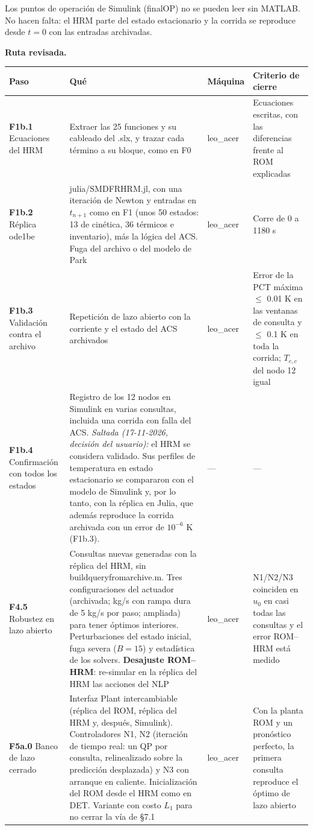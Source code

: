 \documentclass[11pt,a4paper]{article}
\newcommand{\codeus}{\textunderscore\allowbreak}
\newcommand{\code}[1]{{\small\ttfamily\let\_\codeus #1}}
\begin{document}
Los puntos de operación de Simulink (\code{finalOP\_*}) no se pueden leer sin MATLAB. No hacen falta: el HRM parte del estado estacionario y la corrida se reproduce desde $t=0$ con las entradas archivadas.

\textbf{Ruta revisada.}

{\footnotesize
\begin{xltabular}{\linewidth}{@{}YYYY@{}}
\toprule
\textbf{Paso} & \textbf{Qué} & \textbf{Máquina} & \textbf{Criterio de cierre} \\
\midrule
\endhead
\textbf{F1b.1} Ecuaciones del HRM & Extraer las 25 funciones y su cableado del \code{.slx}, y trazar cada término a su bloque, como en F0 & leo\_acer & Ecuaciones escritas, con las diferencias frente al ROM explicadas \\
\textbf{F1b.2} Réplica \code{ode1be} & \code{julia/SMDFRHRM.jl}, con una iteración de Newton y entradas en $t_{n+1}$ como en F1 (unos 50 estados: 13 de cinética, 36 térmicos e inventario), más la lógica del ACS. Fuga del archivo o del modelo de Park & leo\_acer & Corre de 0 a 1180 s \\
\textbf{F1b.3} Validación contra el archivo & Repetición de lazo abierto con la corriente y el estado del ACS archivados & leo\_acer & Error de la PCT máxima $\le$ 0.01 K en las ventanas de consulta y $\le$ 0.1 K en toda la corrida; $T_{e,c}$ del nodo 12 igual \\
\textbf{F1b.4} Confirmación con todos los estados & Registro de los 12 nodos en Simulink en varias consultas, incluida una corrida con falla del ACS. \emph{Saltada (17-11-2026, decisión del usuario):} el HRM se considera validado. Sus perfiles de temperatura en estado estacionario se compararon con el modelo de Simulink y, por lo tanto, con la réplica en Julia, que además reproduce la corrida archivada con un error de $10^{-6}$ K (F1b.3). & — & — \\
\textbf{F4.5} Robustez en lazo abierto & Consultas nuevas generadas con la réplica del HRM, sin \code{build\_query\_from\_archive.m}. Tres configuraciones del actuador (archivada; kg/s con rampa dura de 5 kg/s por paso; ampliada) para tener óptimos interiores. Perturbaciones del estado inicial, fuga severa ($B=15$) y estadística de los solvers. \textbf{Desajuste ROM–HRM}: re-simular en la réplica del HRM las acciones del NLP & leo\_acer & N1/N2/N3 coinciden en $u_0$ en casi todas las consultas y el error ROM–HRM está medido \\
\textbf{F5a.0} Banco de lazo cerrado & Interfaz \code{Plant} intercambiable (réplica del ROM, réplica del HRM y, después, Simulink). Controladores N1, N2 (iteración de tiempo real: un QP por consulta, relinealizado sobre la predicción desplazada) y N3 con arranque en caliente. Inicialización del ROM desde el HRM como en \code{DET\_2}. Variante con costo $L_1$ para no cerrar la vía de \S{}7.1 & leo\_acer & Con la planta ROM y un pronóstico perfecto, la primera consulta reproduce el óptimo de lazo abierto \\

\end{xltabular}}
\end{document}
